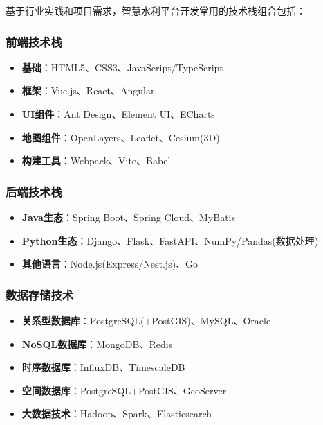 基于行业实践和项目需求，智慧水利平台开发常用的技术栈组合包括：

\subsubsection{前端技术栈}\label{ux524dux7aefux6280ux672fux6808}

\begin{itemize}
\tightlist
\item
  \textbf{基础}：HTML5、CSS3、JavaScript/TypeScript
\item
  \textbf{框架}：Vue.js、React、Angular
\item
  \textbf{UI组件}：Ant Design、Element UI、ECharts
\item
  \textbf{地图组件}：OpenLayers、Leaflet、Cesium(3D)
\item
  \textbf{构建工具}：Webpack、Vite、Babel
\end{itemize}

\subsubsection{后端技术栈}\label{ux540eux7aefux6280ux672fux6808}

\begin{itemize}
\tightlist
\item
  \textbf{Java生态}：Spring Boot、Spring Cloud、MyBatis
\item
  \textbf{Python生态}：Django、Flask、FastAPI、NumPy/Pandas(数据处理)
\item
  \textbf{其他语言}：Node.js(Express/Nest.js)、Go
\end{itemize}

\subsubsection{数据存储技术}\label{ux6570ux636eux5b58ux50a8ux6280ux672f}

\begin{itemize}
\tightlist
\item
  \textbf{关系型数据库}：PostgreSQL(+PostGIS)、MySQL、Oracle
\item
  \textbf{NoSQL数据库}：MongoDB、Redis
\item
  \textbf{时序数据库}：InfluxDB、TimescaleDB
\item
  \textbf{空间数据库}：PostgreSQL+PostGIS、GeoServer
\item
  \textbf{大数据技术}：Hadoop、Spark、Elasticsearch
\end{itemize}

